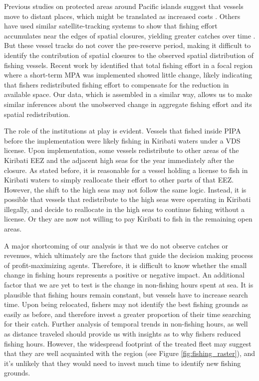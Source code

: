 \documentclass[9pttwoside,lineno]{pnas-new}
\begin{document}
Previous studies on protected areas around Pacific islands suggest that vessels move to
distant places, which might be translated as increased costs
\citep{stevenson_2013}. Others have used similar satellite-tracking systems to
show that fishing effort accumulates near the edges of spatial closures,
yielding greater catches over time \citep{murawski_2005}. But these vessel tracks
do not cover the pre-reserve period, making it difficult to identify the
contribution of spatial closures to the observed spatial distribution of
fishing vessels. Recent work by \cite{elahi_2018} identified that total
fishing effort in a focal region where a short-term MPA was implemented
showed little change, likely indicating that fishers redistributed
fishing effort to compensate for the reduction in available space. Our
data, which is assembled in a similar way, allows us to make similar
inferences about the unobserved change in aggregate fishing effort and
its spatial redistribution.

The role of the institutions at play is evident. Vessels that fished
inside PIPA before the implementation were likely fishing in
Kiribati waters under a VDS license. Upon implementation,
some vessels redistribute to other areas of the Kiribati EEZ and the adjacent
high seas for the year immediately after the closure. As stated before,
it is reasonable for a vessel holding a license to fish in Kiribati
waters to simply reallocate their effort to other parts of that EEZ.
However, the shift to the high seas may not follow the same logic.
Instead, it is possible that vessels that redistribute to the high seas
were operating in Kiribati illegally, and decide to reallocate in the
high seas to continue fishing without a license. Or they are now not willing to pay Kiribati to fish in the remaining open areas.

A major shortcoming of our analysis is that we do not observe catches or
revenues, which ultimately are the factors that guide the decision
making process of profit-maximizing agents. Therefore, it is difficult
to know whether the small change in fishing hours represents a positive or
negative impact. An additional factor that we are yet to test is the
change in non-fishing hours spent at sea. It is plausible that fishing
hours remain constant, but vessels have to increase search time. Upon
being relocated, fishers may not identify the best fishing grounds as
easily as before, and therefore invest a greater proportion of their
time searching for their catch. Further analysis of temporal trends in
non-fishing hours, as well as distance traveled should provide us with
insights as to why fishers reduced fishing hours. However, the
widespread footprint of the treated fleet may suggest that they are well
acquainted with the region (see Figure \ref{fig:fishing_raster}), and it's
unlikely that they would need to invest much time to identify new fishing grounds.
\end{document}
